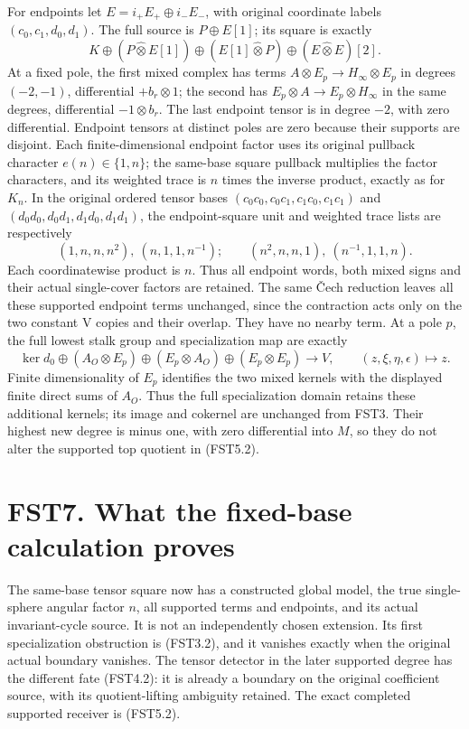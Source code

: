 For endpoints let \(E=i_+E_+\oplus i_-E_-\), with original coordinate
labels \((c_0,c_1,d_0,d_1)\). The full source is \(P\oplus E[1]\); its
square is exactly \[
K\oplus(P\widehat\otimes E[1])\oplus(E[1]\widehat\otimes P)
\oplus(E\widehat\otimes E)[2].
\tag{FST6.2}
\] At a fixed pole, the first mixed complex has terms
\(A\otimes E_p\to H_\infty\otimes E_p\) in degrees \((-2,-1)\),
differential \(+b_r\otimes1\); the second has
\(E_p\otimes A\to E_p\otimes H_\infty\) in the same degrees,
differential \(-1\otimes b_r\). The last endpoint tensor is in degree
\(-2\), with zero differential. Endpoint tensors at distinct poles are
zero because their supports are disjoint. Each finite-dimensional
endpoint factor uses its original pullback character \(e(n)\in\{1,n\}\);
the same-base square pullback multiplies the factor characters, and its
weighted trace is \(n\) times the inverse product, exactly as for
\(K_n\). In the original ordered tensor bases
\((c_0c_0,c_0c_1,c_1c_0,c_1c_1)\) and \((d_0d_0,d_0d_1,d_1d_0,d_1d_1)\),
the endpoint-square unit and weighted trace lists are respectively \[
(1,n,n,n^2),\ (n,1,1,n^{-1});\qquad
(n^2,n,n,1),\ (n^{-1},1,1,n).
\] Each coordinatewise product is \(n\). Thus all endpoint words, both
mixed signs and their actual single-cover factors are retained. The same
Čech reduction leaves all these supported endpoint terms unchanged,
since the contraction acts only on the two constant V copies and their
overlap. They have no nearby term. At a pole \(p\), the full lowest
stalk group and specialization map are exactly \[
\ker d_0\oplus(A_O\otimes E_p)\oplus(E_p\otimes A_O)\oplus(E_p\otimes E_p)
\longrightarrow V,\qquad(z,\xi,\eta,\epsilon)\longmapsto z.
\tag{FST6.3}
\] Finite dimensionality of \(E_p\) identifies the two mixed kernels
with the displayed finite direct sums of \(A_O\). Thus the full
specialization domain retains these additional kernels; its image and
cokernel are unchanged from FST3. Their highest new degree is minus one,
with zero differential into \(M\), so they do not alter the supported
top quotient in (FST5.2).

\section{FST7. What the fixed-base calculation
proves}\label{fst7.-what-the-fixed-base-calculation-proves}

The same-base tensor square now has a constructed global model, the true
single-sphere angular factor \(n\), all supported terms and endpoints,
and its actual invariant-cycle source. It is not an independently chosen
extension. Its first specialization obstruction is (FST3.2), and it
vanishes exactly when the original actual boundary vanishes. The tensor
detector in the later supported degree has the different fate (FST4.2):
it is already a boundary on the original coefficient source, with its
quotient-lifting ambiguity retained. The exact completed supported
receiver is (FST5.2).

